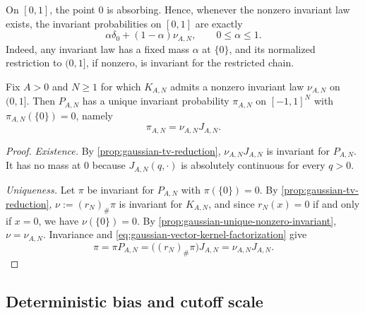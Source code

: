 \documentclass[11pt,reqno,a4paper]{article}
\begin{document}
\begin{remark}\label{rem:gaussian-full-space-invariant}
  On $[0,1]$, the point $0$ is absorbing. Hence, whenever the nonzero
  invariant law exists,
  the invariant probabilities on $[0,1]$ are exactly
  \begin{equation}\label{eq:gaussian-full-space-invariant-laws}
    \alpha\delta_0+(1-\alpha)\nu_{A,N},
    \qquad 0\leq\alpha\leq1.
  \end{equation}
  Indeed, any invariant law has a fixed mass $\alpha$ at $\{0\}$, and its
  normalized restriction to $(0,1]$, if nonzero, is invariant for the
  restricted chain.
\end{remark}

\begin{corollary}
\label{cor:gaussian-unique-vector-invariant}
  Fix $A>0$ and $N\geq1$ for which $K_{A,N}$ admits a nonzero invariant law
  $\nu_{A,N}$ on $(0,1]$. Then $P_{A,N}$ has a unique invariant probability
  $\pi_{A,N}$ on $[-1,1]^N$ with $\pi_{A,N}(\{0\})=0$, namely
  \begin{equation}\label{eq:gaussian-unique-vector-invariant}
    \pi_{A,N}=\nu_{A,N}J_{A,N}.
  \end{equation}
\end{corollary}

\begin{proof}
  \emph{Existence.}
  By \cref{prop:gaussian-tv-reduction},
  $\nu_{A,N}J_{A,N}$ is invariant for $P_{A,N}$. It has no mass at $0$ because
  $J_{A,N}(q,\cdot)$ is absolutely continuous for every $q>0$.

  \emph{Uniqueness.}
  Let $\pi$ be invariant for $P_{A,N}$ with $\pi(\{0\})=0$. By
  \cref{prop:gaussian-tv-reduction}, $\nu:=(r_N)_\#\pi$ is invariant for
  $K_{A,N}$, and since $r_N(x)=0$ if and only if $x=0$, we have
  $\nu(\{0\})=0$. By \cref{prop:gaussian-unique-nonzero-invariant},
  $\nu=\nu_{A,N}$. Invariance and
  \cref{eq:gaussian-vector-kernel-factorization} give
  \begin{equation*}
    \pi
    =
    \pi P_{A,N}
    =
    \bigl((r_N)_\#\pi\bigr)J_{A,N}
    =
    \nu_{A,N}J_{A,N}.
  \end{equation*}
\end{proof}

\subsection{Deterministic bias and cutoff scale}
\label{subsec:gaussian-mean-field-cutoff}
\end{document}
